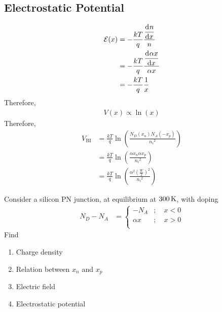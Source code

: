 \documentclass[titlepage, fleqn, a4paper, 12pt, twoside]{article}
\theoremstyle{definition}
\theoremstyle{theorem}
\begin{document}
\subsection{Electrostatic Potential}

\begin{align*}
	\mathcal{E}(x) & = -\frac{k T}{q} \frac{\dod{n}{x}}{n}               \\
                       & = -\frac{k T}{q} \frac{\dod{\alpha x}{x}}{\alpha x} \\
                       & = -\frac{k T}{q} \frac{1}{x}
\end{align*}
Therefore,
\begin{align*}
	V(x) \propto \ln(x)
\end{align*}
Therefore,
\begin{align*}
	V_{\text{BI}} & = \frac{k T}{q} \ln\left( \frac{N_D(x_n) N_A(-x_p)}{{n_i}^2} \right)    \\
                      & = \frac{k T}{q} \ln\left( \frac{\alpha x_n \alpha x_p}{{n_i}^2} \right) \\
                      & = \frac{k T}{q} \ln\left( \frac{\alpha^2 \left( \frac{W}{2} \right)^2}{{n_i}^2} \right)
\end{align*}

\begin{question}
	Consider a silicon PN junction, at equilibrium at $300 \kelvin$, with doping
	\begin{align*}
		N_D - N_A &=
			\begin{cases}
				-N_A     & ;\quad x < 0 \\
				\alpha x & ;\quad x > 0 \\
			\end{cases}
	\end{align*}
	Find
	\begin{enumerate}
		\item Charge density
		\item Relation between $x_n$ and $x_p$
		\item Electric field
		\item Electrostatic potential
	\end{enumerate}
\end{question}
\end{document}

